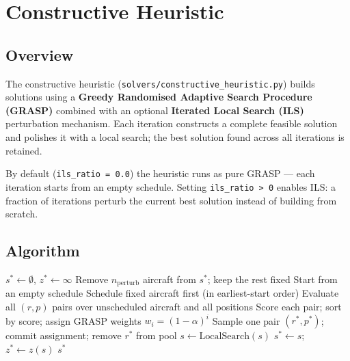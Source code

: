 \section{Constructive Heuristic}
\label{sec:constructive}

\subsection{Overview}

The constructive heuristic (\texttt{solvers/constructive\_heuristic.py}) builds
solutions using a \textbf{Greedy Randomised Adaptive Search Procedure (GRASP)}
combined with an optional \textbf{Iterated Local Search (ILS)} perturbation
mechanism.  Each iteration constructs a complete feasible solution and polishes
it with a local search; the best solution found across all iterations is
retained.

By default (\texttt{ils\_ratio = 0.0}) the heuristic runs as pure GRASP —
each iteration starts from an empty schedule.  Setting \texttt{ils\_ratio > 0}
enables ILS: a fraction of iterations perturb the current best solution instead
of building from scratch.

\subsection{Algorithm}

\begin{algorithm}[H]
\caption{Constructive Heuristic (GRASP + ILS)}
\begin{algorithmic}[1]
\State $s^* \leftarrow \emptyset$, $z^* \leftarrow \infty$
        \State Remove $n_{\text{perturb}}$ aircraft from $s^*$; keep the rest fixed
    \Else
        \State Start from an empty schedule
    \EndIf
    \State Schedule fixed aircraft first (in earliest-start order)
        \State Evaluate all $(r, p)$ pairs over unscheduled aircraft and all positions
        \State Score each pair; sort by score; assign GRASP weights $w_i = (1-\alpha)^i$
        \State Sample one pair $(r^*, p^*)$; commit assignment; remove $r^*$ from pool
    \EndWhile
        \State $s \leftarrow \text{LocalSearch}(s)$
    \EndIf
     \; $s^* \leftarrow s$; $z^* \leftarrow z(s)$ \EndIf
\EndWhile
\State \Return $s^*$
\end{algorithmic}
\end{algorithm}

